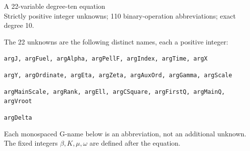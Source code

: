 \documentclass[10pt]{article}
\begin{document}
\begin{center}{\Large A 22-variable degree-ten equation}\\
Strictly positive integer unknowns; 110 binary-operation abbreviations; exact degree 10.
\end{center}
The 22 unknowns are the following distinct names, each a positive integer:
\par\small
\noindent\texttt{argJ, argFuel, argAlpha, argPellF, argIndex, argTime, argX}\par
\noindent\texttt{argY, argOrdinate, argEta, argZeta, argAuxOrd, argGamma, argScale}\par
\noindent\texttt{argMainScale, argRank, argEll, argCSquare, argFirstQ, argMainQ, argVroot}\par
\noindent\texttt{argDelta}\par
\normalsize
Each monospaced G-name below is an abbreviation, not an additional unknown.
The fixed integers $\beta,K,\mu,\omega$ are defined after the equation.
\end{document}
